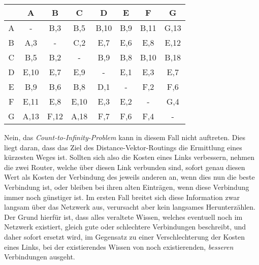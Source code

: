 \documentclass{../exercisesheet}
\begin{document}
\begin{exercise}{4}
\begin{subexercise}
\begin{center}
\begin{tabular}{c||c|c|c|c|c|c|c}
 & A & B & C & D & E & F & G \\
\hline
\hline
A & - & B,3 & B,5 & B,10 & B,9 & B,11 & G,13 \\
\hline
B & A,3 & - & C,2 & E,7 & E,6 & E,8 & E,12 \\
\hline
C & B,5 & B,2 & - & B,9 & B,8 & B,10 & B,18 \\
\hline
D & E,10 & E,7 & E,9 & - & E,1 & E,3 & E,7 \\
\hline
E & B,9 & B,6 & B,8 & D,1 & - & F,2 & F,6 \\
\hline
F & E,11 & E,8 & E,10 & E,3 & E,2 & - & G,4 \\
\hline
G & A,13 & F,12 & A,18 & F,7 & F,6 & F,4 & - \\
\hline
\end{tabular}
\end{center}
\end{subexercise}
\begin{subexercise}
Nein, das \textit{Count-to-Infinity-Problem} kann in diesem Fall nicht auftreten. Dies liegt daran, dass das Ziel des Distance-Vektor-Routings die Ermittlung eines kürzesten Weges ist. Sollten sich also die Kosten eines Links verbessern, nehmen die zwei Router, welche über diesen Link verbunden sind, sofort genau diesen Wert als Kosten der Verbindung des jeweils anderen an, wenn dies nun die beste Verbindung ist, oder bleiben bei ihren alten Einträgen, wenn diese Verbindung immer noch günstiger ist. Im ersten Fall breitet sich diese Information zwar langsam über das Netzwerk aus, verursacht aber kein langsames Herunterzählen. Der Grund hierfür ist, dass alles veraltete Wissen, welches eventuell noch im Netzwerk existiert, gleich gute oder schlechtere Verbindungen beschreibt, und daher sofort ersetzt wird, im Gegensatz zu einer Verschlechterung der Kosten eines Links, bei der existierendes Wissen von noch existierenden, \textit{besseren} Verbindungen ausgeht.
\end{subexercise}
\end{exercise}
\end{document}
